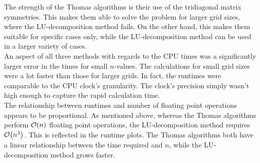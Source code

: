 \documentclass[notitlepage, reprint, nofootinbib]{revtex4-1}
\begin{document}
\clearpage
\twocolumngrid
The strength of the Thomas algorithms is their use of the tridiagonal matrix symmetries. This makes them able to solve the problem for larger grid sizes, where the LU-decomposition method fails. On the other hand, this makes them suitable for specific cases only, while the LU-decomposition method can be used in a larger variety of cases.\\[2mm]
An aspect of all three methods with regards to the CPU times was a significantly larger error in the times for small $n$-values. The calculations for small grid sizes were a lot faster than those for larger grids. In fact, the runtimes were comparable to the CPU clock's granularity. The clock's precision simply wasn't high enough to capture the rapid calculation time. \\[2mm]
The relationship between runtimes and number of floating point operations appears to be proportional. As mentioned above, whereas the Thomas algorithms perform $\order{n}$ floating point operations, the LU-decomposition method requires $\order{n^3}$. This is reflected in the runtime plots. The Thomas algorithms both have a linear relationship between the time required and $n$, while the LU-decomposition method grows faster. 
\end{document}

